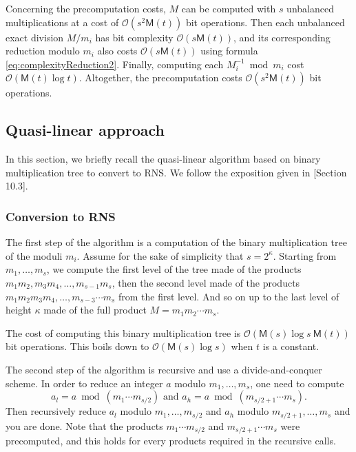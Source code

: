 \documentclass[acmtoms,acmnow]{acmtrans2m}
\def\M{\mathsf{M}} \def\I{\mathsf{I}} \def\R{\mathsf{R}} \def\Q{\mathbb{Q}}
\def\bigO{{\ensuremath{\mathcal{O}}}}
\begin{document}
Concerning the precomputation costs, $M$ can be computed with $s$ unbalanced multiplications at a cost of $\bigO(s^2 \M(t))$ bit operations. Then each unbalanced exact division $M/m_i$ has bit complexity $\bigO(s \M(t))$,
and its corresponding reduction modulo $m_i$ also costs
$\bigO( s \M(t))$ using formula
\eqref{eq:complexityReduction2}. Finally, computing  each $M_i^{-1} \bmod m_i$ cost $\bigO(\M(t)\log t)$. Altogether, the precomputation costs
$\bigO( s^2 \M(t))$ bit operations.

\subsection{Quasi-linear approach}

In this section, we briefly recall the quasi-linear algorithm based on binary
multiplication tree to convert to RNS. We follow the exposition given in 
\cite{GaGe03}[Section 10.3].

\subsubsection{Conversion to RNS}\label{sec:tornsfast}

The first step of the algorithm is a computation of the binary multiplication
tree of the moduli $m_i$. Assume for the sake of simplicity that $s= 2^\kappa$.
Starting from $m_1,\dots,m_s$, we compute the first level of the tree made of
the products $m_1 m_2, m_3 m_4, \dots, m_{s-1} m_s$, then the second level made
of the products $m_1 m_2 m_3 m_4, \dots, m_{s-3} \cdots m_s$ from the first level. And
so on up to the last level of height $\kappa$ made of the full product
$M=m_1 m_2 \cdots m_s$.

The cost of computing this binary multiplication tree is $\bigO(\M(s) \log s~\M(t))$ bit operations.
This boils down to $\bigO(\M(s) \log s)$ when $t$ is a constant.

\medskip

The second step of the algorithm is recursive and use a divide-and-conquer
scheme. In order to reduce an integer $a$ modulo $m_1,\dots,m_s$, one need to compute
\[a_l = a \bmod (m_1 \cdots m_{s/2}) \mbox{ and } a_h = a \bmod (m_{s/2+1} \cdots m_s).\]
 Then recursively reduce $a_l$ modulo $m_1,\dots,m_{s/2}$ and $a_h$ modulo $m_{s/2+1},\dots,m_s$ and you are
done. Note that the products $m_1 \cdots m_{s/2}$ and $m_{s/2+1} \cdots m_s$
were precomputed, and this holds for every products required in the recursive calls.
\end{document}
